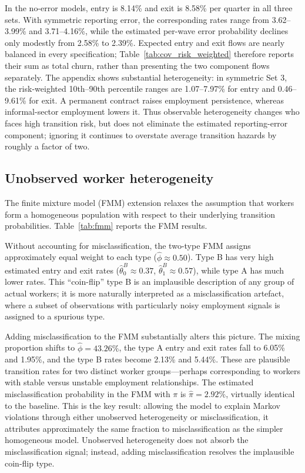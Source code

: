 In the no-error models, entry is 8.14\% and exit is 8.58\% per quarter in all
three sets. With symmetric reporting error, the corresponding rates range from
3.62--3.99\% and 3.71--4.16\%, while the estimated per-wave error probability
declines only modestly from 2.58\% to 2.39\%. Expected entry and exit flows are
nearly balanced in every specification; Table~\ref{tab:cov_risk_weighted}
therefore reports their sum as total churn, rather than presenting the two
component flows separately. The appendix shows substantial
heterogeneity: in symmetric Set 3, the risk-weighted 10th--90th percentile
ranges are 1.07--7.97\% for entry and 0.46--9.61\% for exit. A permanent
contract raises employment persistence, whereas informal-sector employment
lowers it. Thus observable heterogeneity changes who faces high transition
risk, but does not eliminate the estimated reporting-error component; ignoring
it continues to overstate average transition hazards by roughly a factor of two.

\subsection{Unobserved worker heterogeneity}\label{subsec:results:fmm}

The finite mixture model (FMM) extension relaxes the assumption that workers
form a homogeneous population with respect to their underlying transition
probabilities. Table~\ref{tab:fmm} reports the FMM results.

Without accounting for misclassification, the two-type FMM assigns approximately
equal weight to each type ($\hat{\phi} \approx 0.50$). Type B has very high
estimated entry and exit rates ($\hat{\theta}_0^B \approx 0.37$,
$\hat{\theta}_1^B \approx 0.57$), while type A has much lower rates. This
``coin-flip'' type B is an implausible description of any group of actual workers;
it is more naturally interpreted as a misclassification artefact, where a subset
of observations with particularly noisy employment signals is assigned to a
spurious type.

Adding misclassification to the FMM substantially alters this picture. The mixing
proportion shifts to $\hat{\phi} = 43.26\%$, the type A entry and exit rates
fall to 6.05\% and 1.95\%, and the type B rates become 2.13\% and 5.44\%.
These are plausible transition rates for two distinct worker groups---perhaps
corresponding to workers with stable versus unstable employment relationships.
The estimated misclassification probability in the FMM with $\pi$ is
$\hat{\pi} = 2.92\%$, virtually identical to the baseline. This is the key
result: allowing the model to explain Markov violations through either
unobserved heterogeneity or misclassification, it attributes approximately the
same fraction to misclassification as the simpler homogeneous model. Unobserved
heterogeneity does not absorb the misclassification signal; instead, adding
misclassification resolves the implausible coin-flip type.

